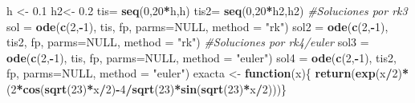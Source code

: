 \documentclass[]{article}
\newenvironment{Shaded}{\begin{snugshade}}{\end{snugshade}}
\newcommand{\KeywordTok}[1]{\textcolor[rgb]{0.13,0.29,0.53}{\textbf{#1}}}
\newcommand{\DataTypeTok}[1]{\textcolor[rgb]{0.13,0.29,0.53}{#1}}
\newcommand{\DecValTok}[1]{\textcolor[rgb]{0.00,0.00,0.81}{#1}}
\newcommand{\FloatTok}[1]{\textcolor[rgb]{0.00,0.00,0.81}{#1}}
\newcommand{\StringTok}[1]{\textcolor[rgb]{0.31,0.60,0.02}{#1}}
\newcommand{\CommentTok}[1]{\textcolor[rgb]{0.56,0.35,0.01}{\textit{#1}}}
\newcommand{\OtherTok}[1]{\textcolor[rgb]{0.56,0.35,0.01}{#1}}
\newcommand{\ControlFlowTok}[1]{\textcolor[rgb]{0.13,0.29,0.53}{\textbf{#1}}}
\newcommand{\OperatorTok}[1]{\textcolor[rgb]{0.81,0.36,0.00}{\textbf{#1}}}
\newcommand{\NormalTok}[1]{#1}
\begin{document}
\begin{Shaded}
\begin{Highlighting}[]
\NormalTok{h <-}\StringTok{ }\FloatTok{0.1}
\NormalTok{h2<-}\StringTok{ }\FloatTok{0.2}
\NormalTok{tis=}\StringTok{ }\KeywordTok{seq}\NormalTok{(}\DecValTok{0}\NormalTok{,}\DecValTok{20}\OperatorTok{*}\NormalTok{h,h)}
\NormalTok{tis2=}\StringTok{ }\KeywordTok{seq}\NormalTok{(}\DecValTok{0}\NormalTok{,}\DecValTok{20}\OperatorTok{*}\NormalTok{h2,h2)}
\CommentTok{#Soluciones por rk3}
\NormalTok{sol =}\StringTok{ }\KeywordTok{ode}\NormalTok{(}\KeywordTok{c}\NormalTok{(}\DecValTok{2}\NormalTok{,}\OperatorTok{-}\DecValTok{1}\NormalTok{), tis, fp, }\DataTypeTok{parms=}\OtherTok{NULL}\NormalTok{, }\DataTypeTok{method =} \StringTok{"rk"}\NormalTok{)}
\NormalTok{sol2 =}\StringTok{ }\KeywordTok{ode}\NormalTok{(}\KeywordTok{c}\NormalTok{(}\DecValTok{2}\NormalTok{,}\OperatorTok{-}\DecValTok{1}\NormalTok{), tis2, fp, }\DataTypeTok{parms=}\OtherTok{NULL}\NormalTok{, }\DataTypeTok{method =} \StringTok{"rk"}\NormalTok{)}
\CommentTok{#Soluciones por rk4/euler}
\NormalTok{sol3 =}\StringTok{ }\KeywordTok{ode}\NormalTok{(}\KeywordTok{c}\NormalTok{(}\DecValTok{2}\NormalTok{,}\OperatorTok{-}\DecValTok{1}\NormalTok{), tis, fp, }\DataTypeTok{parms=}\OtherTok{NULL}\NormalTok{, }\DataTypeTok{method =} \StringTok{"euler"}\NormalTok{)}
\NormalTok{sol4 =}\StringTok{ }\KeywordTok{ode}\NormalTok{(}\KeywordTok{c}\NormalTok{(}\DecValTok{2}\NormalTok{,}\OperatorTok{-}\DecValTok{1}\NormalTok{), tis2, fp, }\DataTypeTok{parms=}\OtherTok{NULL}\NormalTok{, }\DataTypeTok{method =} \StringTok{"euler"}\NormalTok{)}
\NormalTok{exacta <-}\StringTok{ }\ControlFlowTok{function}\NormalTok{(x)\{ }\KeywordTok{return}\NormalTok{(}\KeywordTok{exp}\NormalTok{(x}\OperatorTok{/}\DecValTok{2}\NormalTok{)}\OperatorTok{*}\NormalTok{(}\DecValTok{2}\OperatorTok{*}\KeywordTok{cos}\NormalTok{(}\KeywordTok{sqrt}\NormalTok{(}\DecValTok{23}\NormalTok{)}\OperatorTok{*}\NormalTok{x}\OperatorTok{/}\DecValTok{2}\NormalTok{)}\OperatorTok{-}\DecValTok{4}\OperatorTok{/}\KeywordTok{sqrt}\NormalTok{(}\DecValTok{23}\NormalTok{)}\OperatorTok{*}\KeywordTok{sin}\NormalTok{(}\KeywordTok{sqrt}\NormalTok{(}\DecValTok{23}\NormalTok{)}\OperatorTok{*}\NormalTok{x}\OperatorTok{/}\DecValTok{2}\NormalTok{)))\} }


\end{Highlighting}
\end{Shaded}
\end{document}
